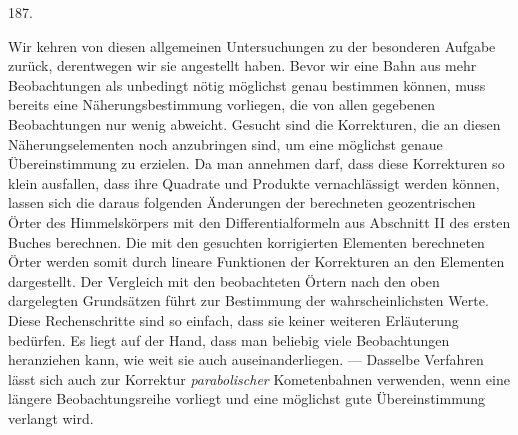 \begin{center}\hypertarget{native-260-article187}{}187.\end{center}
Wir kehren von diesen allgemeinen Untersuchungen zu der besonderen Aufgabe
zurück, derentwegen wir sie angestellt haben. Bevor wir eine Bahn aus mehr
Beobachtungen als unbedingt nötig möglichst genau bestimmen können, muss
bereits eine Näherungsbestimmung vorliegen, die von allen gegebenen
Beobachtungen nur wenig abweicht. Gesucht sind die Korrekturen, die an
diesen Näherungselementen noch anzubringen sind, um eine möglichst genaue
Übereinstimmung zu erzielen. Da man annehmen darf, dass diese Korrekturen
so klein ausfallen, dass ihre Quadrate und Produkte vernachlässigt
werden können, lassen sich die daraus folgenden Änderungen der berechneten
geozentrischen Örter des Himmelskörpers mit den Differentialformeln aus
Abschnitt II des ersten Buches berechnen. Die mit den gesuchten korrigierten
Elementen berechneten Örter werden somit durch lineare Funktionen der
Korrekturen an den Elementen dargestellt. Der Vergleich mit den beobachteten
Örtern nach den oben dargelegten Grundsätzen führt zur Bestimmung der
wahrscheinlichsten Werte. Diese Rechenschritte sind so einfach, dass sie
keiner weiteren Erläuterung bedürfen. Es liegt auf der Hand, dass man
beliebig viele Beobachtungen heranziehen kann, wie weit sie auch
auseinanderliegen. --- Dasselbe Verfahren lässt sich auch zur Korrektur
\emph{parabolischer} Kometenbahnen verwenden, wenn eine längere
Beobachtungsreihe vorliegt und eine möglichst gute Übereinstimmung
verlangt wird.
